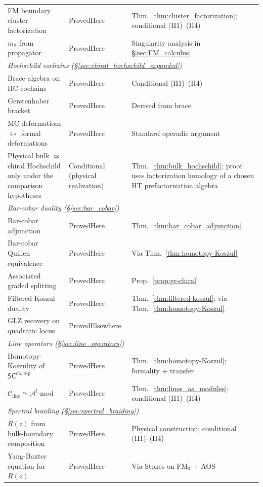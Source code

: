 \begin{center}
\begin{tabular}{p{}p{}p{}}
FM boundary cluster factorization & ProvedHere & Thm.~\ref{thm:cluster_factorization}; conditional (H1)--(H4) \\
$m_2$ from propagator & ProvedHere & Singularity analysis in \S\ref{sec:FM_calculus} \\
\hline
\multicolumn{3}{l}{\emph{Hochschild cochains (\S\ref{sec:chiral_hochschild_expanded})}} \\
Brace algebra on HC cochains & ProvedHere & Conditional (H1)--(H4) \\
Gerstenhaber bracket & ProvedHere & Derived from brace \\
MC deformations $\leftrightarrow$ formal deformations & ProvedHere & Standard operadic argument \\
Physical bulk $\simeq$ chiral Hochschild only under the comparison hypotheses & Conditional (physical realization) & Thm.~\ref{thm:bulk_hochschild}; proof uses factorization homology of a chosen HT prefactorization algebra \\
\hline
\multicolumn{3}{l}{\emph{Bar-cobar duality (\S\ref{sec:bar_cobar})}} \\
Bar-cobar adjunction & ProvedHere & Thm.~\ref{thm:bar_cobar_adjunction} \\
Bar-cobar Quillen equivalence & ProvedHere & Via Thm.~\ref{thm:homotopy-Koszul} \\
Associated graded splitting & ProvedHere & Prop.~\ref{prop:gr-chiral} \\
Filtered Koszul duality & ProvedHere & Thm.~\ref{thm:filtered-koszul}; via Thm.~\ref{thm:homotopy-Koszul} \\
GLZ recovery on quadratic locus & ProvedElsewhere & \cite{GLZ22} \\
\hline
\multicolumn{3}{l}{\emph{Line operators (\S\ref{sec:line_operators})}} \\
Homotopy-Koszulity of $\mathsf{SC}^{\mathrm{ch,top}}$ & ProvedHere & Thm.~\ref{thm:homotopy-Koszul}; formality + transfer \\
$\mathcal{C}_{\mathrm{line}} \simeq \mathcal{A}^!$-mod & ProvedHere & Thm.~\ref{thm:lines_as_modules}; conditional (H1)--(H4) \\
\hline
\multicolumn{3}{l}{\emph{Spectral braiding (\S\ref{sec:spectral_braiding})}} \\
$R(z)$ from bulk-boundary composition & ProvedHere & Physical construction; conditional (H1)--(H4) \\
Yang-Baxter equation for $R(z)$ & ProvedHere & Via Stokes on FM$_3$ + AOS \\

\end{tabular}
\end{center}
